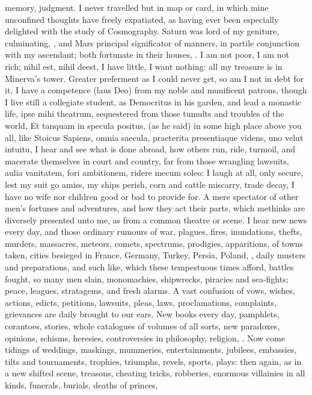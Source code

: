 {memory, judgment. I never travelled but in map or card, in which mine
unconfined thoughts have freely expatiated, as having ever been
especially delighted with the study of Cosmography. Saturn was lord
of my geniture, culminating, \etc, and Mars principal significator of
manners, in partile conjunction with my ascendant; both fortunate in
their houses, \etc. I am not poor, I am not rich; nihil est, nihil deest,
I have little, I want nothing: all my treasure is in Minerva's tower.
Greater preferment as I could never get, so am I not in debt for it, I
have a competence (laus Deo) from my noble and munificent patrons,
though I live still a collegiate student, as Democritus in his garden,
and lead a monastic life, ipse mihi theatrum, sequestered from those
tumults and troubles of the world, Et tanquam in specula positus,
(as he said) in some high place above you all, like Stoicus
Sapiens, omnia saecula, praeterita presentiaque videns, uno velut
intuitu, I hear and see what is done abroad, how others run, ride,
turmoil, and macerate themselves in court and country, far from those
wrangling lawsuits, aulia vanitatem, fori ambitionem, ridere mecum
soleo: I laugh at all, only secure, lest my suit go amiss, my ships
perish, corn and cattle miscarry, trade decay, I have no wife nor
children good or bad to provide for. A mere spectator of other men's
fortunes and adventures, and how they act their parts, which methinks
are diversely presented unto me, as from a common theatre or scene. I
hear new news every day, and those ordinary rumours of war, plagues,
fires, inundations, thefts, murders, massacres, meteors, comets,
spectrums, prodigies, apparitions, of towns taken, cities besieged in
France, Germany, Turkey, Persia, Poland, \etc, daily musters and
preparations, and such like, which these tempestuous times afford,
battles fought, so many men slain, monomachies, shipwrecks, piracies
and sea-fights; peace, leagues, stratagems, and fresh alarms. A vast
confusion of vows, wishes, actions, edicts, petitions, lawsuits, pleas,
laws, proclamations, complaints, grievances are daily brought to our
ears. New books every day, pamphlets, corantoes, stories, whole
catalogues of volumes of all sorts, new paradoxes, opinions, schisms,
heresies, controversies in philosophy, religion, \etc. Now come tidings
of weddings, maskings, mummeries, entertainments, jubilees, embassies,
tilts and tournaments, trophies, triumphs, revels, sports, plays: then
again, as in a new shifted scene, treasons, cheating tricks, robberies,
enormous villainies in all kinds, funerals, burials, deaths of princes,
}
